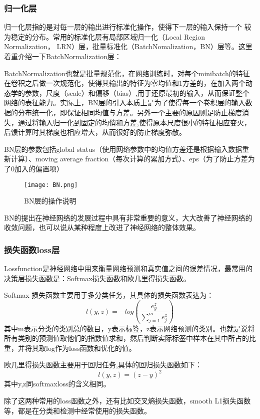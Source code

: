 \subsubsection{归一化层}
归一化层指的是对每一层的输出进行标准化操作，使得下一层的输入保持一个 较为稳定的分布。常用的标准化层有局部区域归一化（Local Region Normalization， LRN）层，批量标准化（BatchNomalization，BN）\cite{BN}层等。这里着重介绍一下BatchNormalization层：

BatchNormalization也就是批量规范化，在网络训练时，对每个minibatch的特征在卷积之后做一次规范化，使得其输出的特征为零均值和1方差的，在加入两个动态学的参数，尺度（scale）和偏移（bias）,用于还原最初的输入，从而保证整个网络的表征能力。实际上，BN层的引入本质上是为了使得每一个卷积层的输入数据的分布统一化，即保证相同均值与方差。另外一个主要的原因则足防止梯度消失，通过将输入归一化到固定的均俏和方差,使得原本尺度很小的特征相应变火，后馈计算时其梯度也相应增大，从而很好的防止梯度弥散。

BN层的参数包括global status（使用网络参数中的均值方差还是根据输入数据重新计算）、moving average fraction（每次计算的累加方式）、eps（为了防止方差为了0加入的偏置项）
\begin{figure}[!ht]
 \centering
	\texttt{[image: BN.png]}
	\caption{BN层的操作说明}
\end{figure}

BN的提出在神经网络的发展过程中具有非常重要的意义，大大改善了神经网络的收敛问题，也可以说从某种程度上改进了神经网络的整体效果。
\subsubsection{损失函数loss层}
Lossfunction是神经网络中用来衡量网络预测和真实值之间的误差情况，最常用的决策层损失函数是：Softmax损失函数和欧几里得损失函数。

Softmax 损失函数主要用于多分类任务，其具体的损失函数表达为：
\begin{equation}{
l(y,z)=-log\left (  \frac{e^z_y}{\sum_{j=1}^{m} e^z_j} \right )
}
\end{equation}
其中m表示分类的类别总的数目，y表示标签，z表示网络预测的类别。也就是说将所有类别的预测值取他们的指数值求和，然后判断实际标签中样本在其中所占的比重，并将其取log作为loss函数和优化的值。

欧几里得损失函数主要用于回归任务,具体的回归损失函数如下：
\begin{equation}{
l(y,z)=(z-y)^2
}
\end{equation}
其中y,z同softmaxloss的含义相同。

除了这两种常用的loss函数之外，还有比如交叉熵损失函数，smooth L1\cite{FASTERRCNN}损失函数等，都是在分类和检测中经常使用的损失函数。

